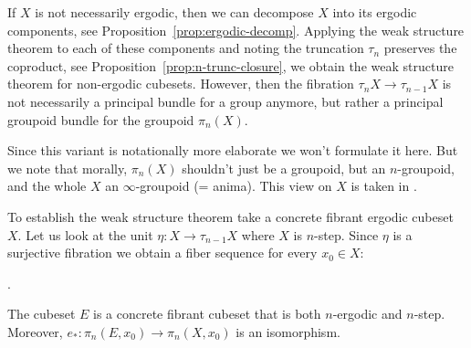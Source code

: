 \begin{remark}
If $X$ is not necessarily ergodic, then we can decompose $X$ into its ergodic components,
see Proposition~\ref{prop:ergodic-decomp}.
Applying the weak structure theorem to each of these components and noting the truncation
$\tau_n$ preserves the coproduct, see Proposition~\ref{prop:n-trunc-closure},
we obtain the weak structure theorem for non-ergodic cubesets.
However, then the fibration $\tau_nX\to\tau_{n-1}X$ is not necessarily a principal bundle for a group anymore,
but rather a principal groupoid bundle for the groupoid $\pi_n(X)$.

Since this variant is notationally more elaborate we won't formulate it here.
But we note that morally, $\pi_n(X)$ shouldn't just be a groupoid, but an $n$-groupoid,
and the whole $X$ an $\infty$-groupoid (= anima).
This view on $X$ is taken in \cite{Bihlmaier2026a}.
\end{remark}

To establish the weak structure theorem take a concrete fibrant ergodic cubeset $X$.
Let us look at the unit $\eta\colon X\to\tau_{n-1}X$
where $X$ is $n$-step.
Since $\eta$ is a surjective fibration we obtain a fiber sequence for every $x_0\in X$:
\begin{center}
.
\end{center}

\begin{proposition}\label{prop:fiber-ergodic-trunc}
The cubeset $E$ is a concrete fibrant cubeset that is both $n$-ergodic and $n$-step.
Moreover, $e_\ast\colon\pi_n(E,x_0)\to\pi_n(X,x_0)$ is an isomorphism.
\end{proposition}

